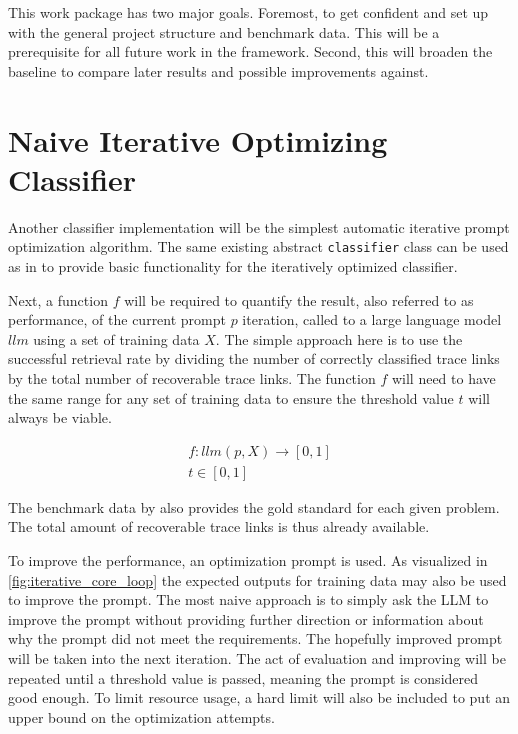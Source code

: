 This work package has two major goals.
Foremost, to get confident and set up with the general project structure and benchmark data.
This will be a prerequisite for all future work in the \LiSSA framework.
Second, this will broaden the baseline to compare later results and possible improvements against.




\section{Naive Iterative Optimizing Classifier}
\label{approach:sec:naive_iterative}
Another classifier implementation will be the simplest automatic iterative prompt optimization algorithm.
The same existing abstract \verb|classifier| class can be used as in  to provide basic functionality for the iteratively optimized classifier.

Next, a function $f$ will be required to quantify the result, also referred to as performance, of the current prompt $p$ iteration, called to a large language model $llm$ using a set of training data $X$.
The simple approach here is to use the successful retrieval rate by dividing the number of correctly classified trace links by the total number of recoverable trace links.
The function $f$ will need to have the same range for any set of training data to ensure the threshold value $t$ will always be viable.

\begin{align}
        f: llm(p, X) \rightarrow [0, 1] \\
        t \in [0, 1]
\end{align}

The benchmark data by  also provides the gold standard for each given problem.
The total amount of recoverable trace links is thus already available. 

To improve the performance, an optimization prompt is used.
As visualized in \autoref{fig:iterative_core_loop} the expected outputs for training data may also be used to improve the prompt.
The most naive approach is to simply ask the LLM to improve the prompt without providing further direction or information about why the prompt did not meet the requirements.
The hopefully improved prompt will be taken into the next iteration.
The act of evaluation and improving will be repeated until a threshold value is passed, meaning the prompt is considered good enough.
To limit resource usage, a hard limit will also be included to put an upper bound on the optimization attempts.

